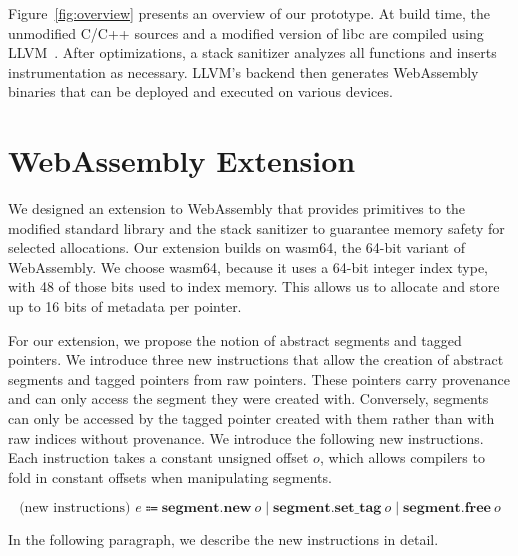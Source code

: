 Figure~\ref{fig:overview} presents an overview of our prototype.
At build time, the unmodified C/C++ sources and a modified version of libc are compiled using LLVM~\cite{lattner2004llvm}.
After optimizations, a stack sanitizer analyzes all functions and inserts instrumentation as necessary.
LLVM's backend then generates WebAssembly binaries that can be deployed and executed on various devices.


\section{WebAssembly Extension}
\label{sec:wasm-extension}

We designed an extension to WebAssembly that provides primitives to the modified standard library and the stack sanitizer to guarantee memory safety for selected allocations.
Our extension builds on wasm64, the 64-bit variant of WebAssembly.
We choose wasm64, because it uses a 64-bit integer index type, with 48 of those bits used to index memory.
This allows us to allocate and store up to 16 bits of metadata per pointer.

For our extension, we propose the notion of abstract segments and tagged pointers.
We introduce three new instructions that allow the creation of abstract segments and tagged pointers from raw pointers.
These pointers carry provenance and can only access the segment they were created with.
Conversely, segments can only be accessed by the tagged pointer created with them rather than with raw indices without provenance.
We introduce the following new instructions.
Each instruction takes a constant unsigned offset $o$, which allows compilers to fold in constant offsets when manipulating segments.

\begin{equation*}
    \text{(new instructions) } e \Coloneqq \textbf{segment.new}\ o \mid \textbf{segment.set\_tag}\ o \mid \textbf{segment.free}\ o
\end{equation*}

\noindent
In the following paragraph, we describe the new instructions in detail.

